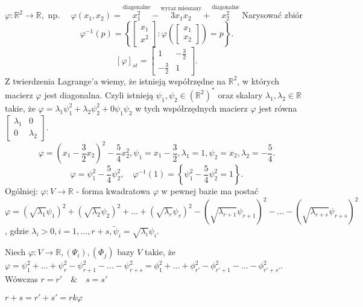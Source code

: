 \documentclass[../main.tex]{subfiles}
\begin{document}
$\varphi: \mathbb{R}^2\to\mathbb{R},\text{ np. }\quad\varphi(x_1,x_2) = \overset{\text{diagonalne}}{x_1^2} - \overset{\text{wyraz mieszany}}{3x_1x_2} + \overset{\text{diagonalne}}{x_2^2}$
Narysować zbiór \[
    \varphi^{-1}(p) = \left\{ \begin{bmatrix} x_1\\x^2 \end{bmatrix}: \varphi\left( \begin{bmatrix} x_1\\x_2 \end{bmatrix}  \right) = p \right\}
.\]
\[
    \left[ \varphi \right] _{st} = \begin{bmatrix} 1&-\frac{3}{2}\\-\frac{3}{2}&1 \end{bmatrix}
.\]
Z twierdzenia Lagrange'a wiemy, że istnieją współrzędne na $\mathbb{R}^2$, w których macierz $\varphi$ jest diagonalna. Czyli istnieją $\psi_1,\psi_2\in\left(\mathbb{R}^2\right)^*$ oraz skalary  $\lambda_1,\lambda_2\in\mathbb{R}$ takie, że $\varphi = \lambda_1\psi_1^2 + \lambda_2\psi_2^2 + 0\psi_1\psi_2$ w tych współrzędnych macierz $\varphi$ jest równa $\begin{bmatrix} \lambda_1&0\\0&\lambda_2 \end{bmatrix}$.
    \[
        \varphi=(x_1-\frac{3}{2}x_2)^2 - \frac{5}{4}x_2^2, \psi_1 = x_1-\frac{3}{2}, \lambda_1 = 1, \psi_2 = x_2, \lambda_2 = -\frac{5}{4}
    .\]
    \[
        \varphi = \psi_1^2 - \frac{5}{4}\psi_2^2,\quad \varphi^{-1}(1) = \left\{ \psi_1^2 - \frac{5}{4}\psi_2^2 = 1 \right\}
    .\]
    Ogólniej: $\varphi: V\to\mathbb{R}$ - forma kwadratowa $\varphi$ w pewnej bazie ma postać $\varphi = (\sqrt{\lambda_1} \psi_1)^2 + (\sqrt{\lambda_2} \psi_2)^2 +\ldots+(\sqrt{\lambda_r} \psi_r)^2 - (\sqrt{\lambda_{r+1}} \psi_{r+1})^2 - \ldots - (\sqrt{\lambda_{r+s}} \psi_{r+s})^2$, gdzie $\lambda_i > 0, i = 1,\ldots,r+s, \tilde \psi_i = \sqrt{\lambda_i} \psi_i $.

    \begin{tw}
        Niech $\varphi:V\to\mathbb{R}, (\Psi_i),(\Phi_j)$ bazy $V$ takie, że $\varphi = \psi_1^2 + \ldots + \psi_r^2 - \psi_{r+1}^2 - \ldots - \psi_{r+s}^2 = \phi_1^2 + \ldots + \phi_{r'}^2 - \phi_{r'+1}^2 - \ldots - \phi_{r'+s'}^2$. Wówczas $r = r' \quad\&\quad s = s'$
    \end{tw}

    \begin{dowod}
        $r+s = r'+s' = rk \varphi$
    \end{dowod}
\end{document}
